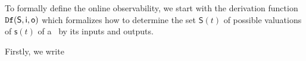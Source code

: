 






To formally define the online observability, we start with the derivation function ${\tt Df}( \mathsf{S},  \mathsf{i},  \mathsf{o})$ which formalizes how to determine the set $\mathsf{S}(t)$ of possible valuations of $\mathsf{s}(t)$ of a \BCN\ by its inputs and outputs.  %

Firstly, we write 

